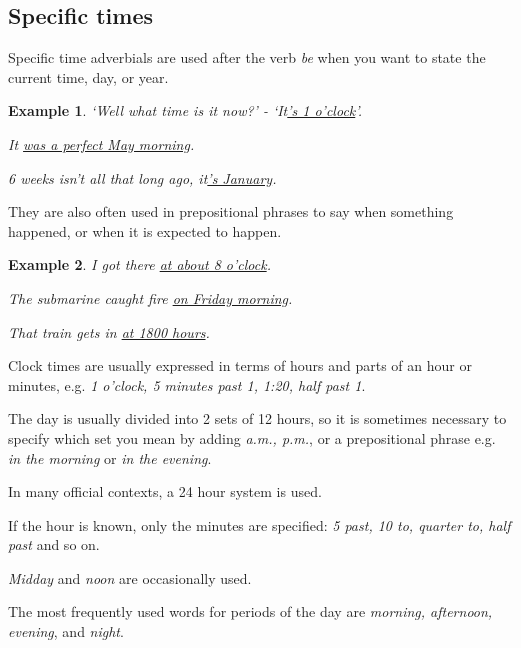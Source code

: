 \documentclass[oneside]{book}
\numberwithin{equation}{section}
\newtheorem{example}{Example}[section]
\begin{document}
\subsection{Specific times}
\noindent{} Specific time adverbials are used after the verb \textit{be} when you want to state the current time, day, or year.
\begin{example}
    `Well what time is it now?' - `It\underline{'s 1 o'clock}'.
    
    It \underline{was a perfect May morning}.
    
    6 weeks isn't all that long ago, it\underline{'s January}.
\end{example}
They are also often used in prepositional phrases to say when something happened, or when it is expected to happen.
\begin{example}
    I got there \underline{at about 8 o'clock}.
    
    The submarine caught fire \underline{on Friday morning}.
    
    That train gets in \underline{at 1800 hours}.
\end{example}
%
\noindent{} Clock times are usually expressed in terms of hours and parts of an hour or minutes, e.g. \textit{1 o'clock, 5 minutes past 1, 1:20, half past 1}.

The day is usually divided into 2 sets of 12 hours, so it is sometimes necessary to specify which set you mean by adding \textit{a.m., p.m.}, or a prepositional phrase e.g. \textit{in the morning} or \textit{in the evening}.

%
In many official contexts, a 24 hour system is used.

%
If the hour is known, only the minutes are specified: \textit{5 past, 10 to, quarter to, half past} and so on.

\textit{Midday} and \textit{noon} are occasionally used.

%
\noindent{} The most frequently used words for periods of the day are \textit{morning, afternoon, evening}, and \textit{night}.
\end{document}
